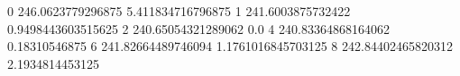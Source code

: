 0 246.0623779296875 5.411834716796875
1 241.6003875732422 0.9498443603515625
2 240.65054321289062 0.0
4 240.83364868164062 0.18310546875
6 241.82664489746094 1.1761016845703125
8 242.84402465820312 2.1934814453125
